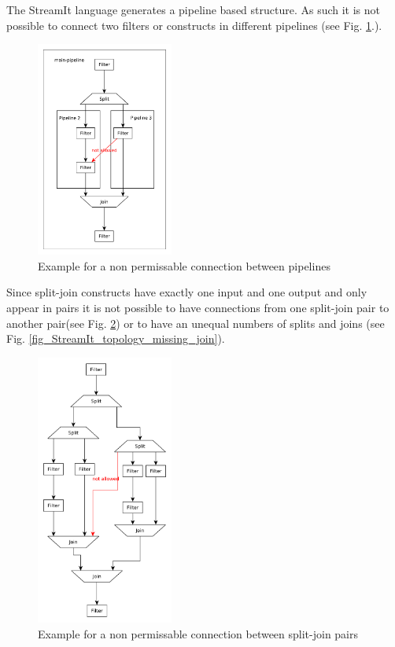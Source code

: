 \documentclass[journal]{IEEEtran}
\begin{document}
\noindent The StreamIt language generates a pipeline based structure. As such
it is not possible to connect two filters or constructs in different pipelines (see Fig.
\ref{fig_StreamIt_topology}.).\\
\begin{figure}[h]
	\centering
	\includegraphics[width=0.4\textwidth]{StreamItTopology}
	\caption{Example for a non permissable connection between pipelines}
	\label{fig_StreamIt_topology}
\end{figure}
\noindent Since split-join constructs have exactly one input and one output and only appear in pairs it is not
 possible to have connections from one split-join pair to another pair(see Fig.
 \ref{fig_StreamIt_topology_between_SJ}) or to have an unequal numbers of splits and joins (see Fig.
 \ref{fig_StreamIt_topology_missing_join}).\\
\begin{figure}[h]
	\centering
	\includegraphics[width=0.4\textwidth]{StreamItTopologyBetweenSJ}
	\caption{Example for a non permissable connection between split-join pairs}
	\label{fig_StreamIt_topology_between_SJ}
\end{figure}
\end{document}
